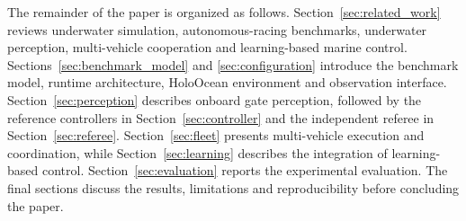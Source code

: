The remainder of the paper is organized as follows.
Section~\ref{sec:related_work} reviews underwater simulation, autonomous-racing
benchmarks, underwater perception, multi-vehicle cooperation and learning-based
marine control. Sections~\ref{sec:benchmark_model} and
\ref{sec:configuration} introduce the benchmark model, runtime
architecture, HoloOcean environment and observation interface.
Section~\ref{sec:perception} describes onboard gate perception, followed by the
reference controllers in Section~\ref{sec:controller} and the independent
referee in Section~\ref{sec:referee}. Section~\ref{sec:fleet} presents
multi-vehicle execution and coordination, while Section~\ref{sec:learning}
describes the integration of learning-based control.
Section~\ref{sec:evaluation} reports the experimental evaluation. The final
sections discuss the results, limitations and reproducibility before concluding
the paper.

